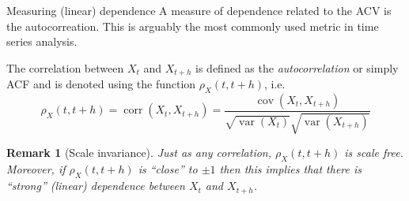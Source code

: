 \documentclass[envcountsect,usenames,dvipsnames]{beamer}
\DeclareMathOperator*{\cov}{cov}
\DeclareMathOperator*{\corr}{corr}
\DeclareMathOperator*{\var}{var}
\theoremstyle{mystyle}
\newtheorem{Remark}{Remark}
\begin{document}

\begin{frame}{Measuring (linear) dependence}
	\small
	A measure of dependence related to the ACV is the autocorreation. This is arguably the most commonly used metric in time series analysis.
	
	\begin{Definition}[Autocorrelation]
		The correlation between $X_{t}$ and $X_{t+h}$ is defined as the {\color{beamer@myorange}\emph{autocorrelation}} or simply ACF and is denoted using the function $\rho_X(t, t+h)$, i.e.
		\begin{equation*}
			\rho_X(t,t+h) = \corr(X_{t},X_{t+h}) = \frac{\cov(X_{t},X_{t+h})}{\sqrt{\var(X_{t})} \sqrt{\var(X_{t+h})}}
		\end{equation*}
	\end{Definition}
	
	\begin{Remark}[Scale invariance]
	Just as any correlation, $\rho_X(t,t+h)$ is scale free. Moreover, if $\rho_X(t,t+h)$ is ``close'' to $\pm 1$ then this implies that there is ``strong'' (linear) dependence between $X_{t}$ and $X_{t+h}$.
	\end{Remark}
\end{frame}
\end{document}
